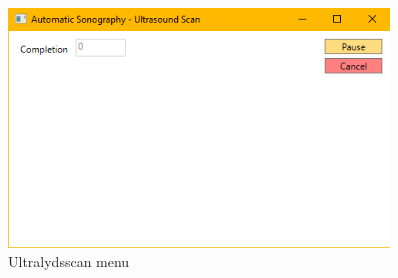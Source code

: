 \begin{figure}[h]
    \centering
    \includegraphics[width=0.9\textwidth]{figurer/d/GUIskitse/ultrasound_scan}
    \caption{Ultralydsscan menu}
    \label{Ultralydsscan}
\end{figure}